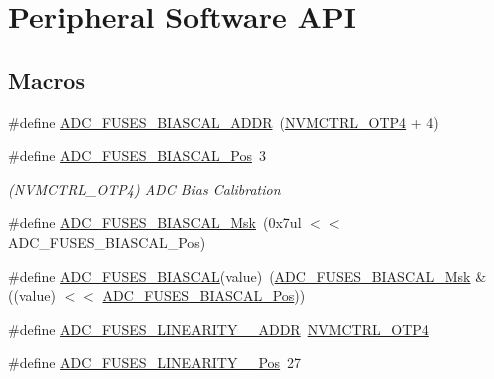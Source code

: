 \hypertarget{group__fuses__api}{}\section{Peripheral Software A\+PI}
\label{group__fuses__api}
\subsection*{Macros}
\begin{DoxyCompactItemize}
\item 
\#define \mbox{\hyperlink{group__fuses__api_ga8972b5e1d68c668524cb8dc8e053dfa9}{A\+D\+C\+\_\+\+F\+U\+S\+E\+S\+\_\+\+B\+I\+A\+S\+C\+A\+L\+\_\+\+A\+D\+DR}}~(\mbox{\hyperlink{group___s_a_m_d21_j18_a__base_ga138b4aca5a0446a745fe143c1dca8165}{N\+V\+M\+C\+T\+R\+L\+\_\+\+O\+T\+P4}} + 4)
\item 
\#define \mbox{\hyperlink{group__fuses__api_ga27a6321a91ab931e0933dbcae98c350d}{A\+D\+C\+\_\+\+F\+U\+S\+E\+S\+\_\+\+B\+I\+A\+S\+C\+A\+L\+\_\+\+Pos}}~3
\begin{DoxyCompactList}\small\item\em (N\+V\+M\+C\+T\+R\+L\+\_\+\+O\+T\+P4) A\+DC Bias Calibration \end{DoxyCompactList}\item 
\#define \mbox{\hyperlink{group__fuses__api_gaafc2b176601d6999e9cef3e9219b9738}{A\+D\+C\+\_\+\+F\+U\+S\+E\+S\+\_\+\+B\+I\+A\+S\+C\+A\+L\+\_\+\+Msk}}~(0x7ul $<$$<$ A\+D\+C\+\_\+\+F\+U\+S\+E\+S\+\_\+\+B\+I\+A\+S\+C\+A\+L\+\_\+\+Pos)
\item 
\#define \mbox{\hyperlink{group__fuses__api_ga378f726f6f4e5ef7b6d5b17e79792ad8}{A\+D\+C\+\_\+\+F\+U\+S\+E\+S\+\_\+\+B\+I\+A\+S\+C\+AL}}(value)~(\mbox{\hyperlink{group__fuses__api_gaafc2b176601d6999e9cef3e9219b9738}{A\+D\+C\+\_\+\+F\+U\+S\+E\+S\+\_\+\+B\+I\+A\+S\+C\+A\+L\+\_\+\+Msk}} \& ((value) $<$$<$ \mbox{\hyperlink{group__fuses__api_ga27a6321a91ab931e0933dbcae98c350d}{A\+D\+C\+\_\+\+F\+U\+S\+E\+S\+\_\+\+B\+I\+A\+S\+C\+A\+L\+\_\+\+Pos}}))
\item 
\#define \mbox{\hyperlink{group__fuses__api_gac72a81c4dcae61916107c114d2942c32}{A\+D\+C\+\_\+\+F\+U\+S\+E\+S\+\_\+\+L\+I\+N\+E\+A\+R\+I\+T\+Y\+\_\+\_\+\+A\+D\+DR}}~\mbox{\hyperlink{group___s_a_m_d21_j18_a__base_ga138b4aca5a0446a745fe143c1dca8165}{N\+V\+M\+C\+T\+R\+L\+\_\+\+O\+T\+P4}}
\item 
\#define \mbox{\hyperlink{group__fuses__api_gaa1879ab54367d19c2a0996cee7fcbb0a}{A\+D\+C\+\_\+\+F\+U\+S\+E\+S\+\_\+\+L\+I\+N\+E\+A\+R\+I\+T\+Y\+\_\+\_\+\+Pos}}~27

\end{DoxyCompactItemize}
